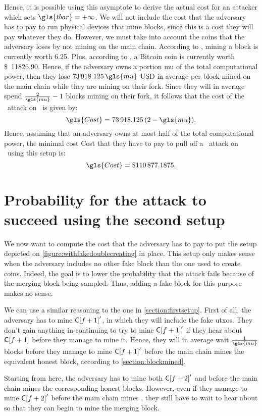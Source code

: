 Hence, it is possible using this asymptote to derive the actual cost for an attacker which sets \(\gls{tbar}=+\infty\). We will not include the cost that the adversary has to pay to run physical devices that mine blocks, since this is a cost they will pay whatever they do. However, we must take into account the coins that the adversary loses by not mining on the main chain. According to \cite{BlockReward}, mining a block is currently worth \SI{6.25}{\bitcoin}. Plus, according to \cite{BitcoinValue}, a Bitcoin coin is currently worth \SI{11826.90}[\$]{}. Hence, if the adversary owns a portion \gls{mu} of the total computational power, then they lose \(\num{73918.125}\,\gls{mu}\) USD in average per block mined on the main chain while they are mining on their fork. Since they will in average spend \(\frac{2}{\gls{mu}}-1\) blocks mining on their fork, it follows that the cost of the \cs\ attack on \FC\ is given by:
\[\gls{Cost}=\num{73918.125}\,(2-\gls{mu}).\]
Hence, assuming that an adversary owns at most half of the total computational power, the minimal cost \gls{Cost} that they have to pay to pull off a \cs\ attack on \FC\ using this setup is:
\[\gls{Cost}=\SI{110877.1875}[\$]{}.\]
    
\section{Probability for the attack to succeed using the second setup}
\label{section:secondsetup}
We now want to compute the cost that the adversary has to pay to put the setup depicted on \autoref{figure:withfakedoublecreating} in place. This setup only makes sense when the adversary includes no other fake block than the one used to create coins. Indeed, the goal is to lower the probability that the attack fails because of the merging block being sampled. Thus, adding a fake block for this purpose makes no sense.

We can use a similar reasoning to the one in \autoref{section:firstsetup}. First of all, the adversary has to mine \(\mathsf{C[}f+1\mathsf{]}'\), in which they will include the fake \glspl{utxo}. They don't gain anything in continuing to try to mine \(\mathsf{C[}f+1\mathsf{]}'\) if they hear about \(\mathsf{C[}f+1\mathsf{]}\) before they manage to mine it. Hence, they will in average wait \(\frac{1}{\gls{mu}}\) blocks before they manage to mine \(\mathsf{C[}f+1\mathsf{]}'\) before the main chain mines the equivalent honest block, according to \autoref{section:blockmined}.

Starting from here, the adversary has to mine both \(\mathsf{C[}f+2\mathsf{]}'\) and  before the main chain mines the corresponding honest blocks. However, even if they manage to mine \(\mathsf{C[}f+2\mathsf{]}'\) before the main chain mines , they still have to wait to hear about  so that they can begin to mine the merging block.

